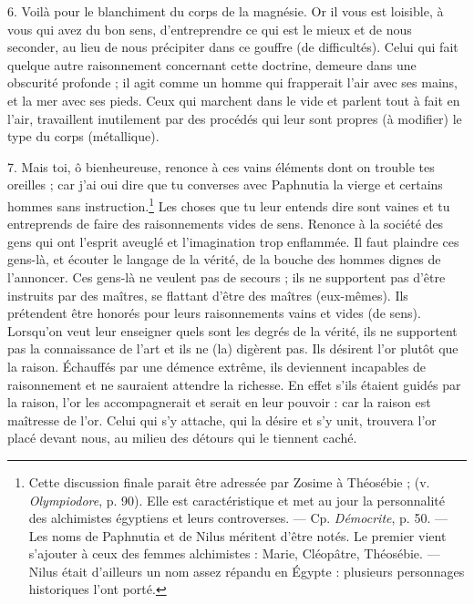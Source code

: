\documentclass[a4paper, 11pt, oneside, polutonikogreek, french]{article}
\begin{document}
6. Voilà pour le blanchiment du corps de la magnésie. Or il vous est loisible, à vous qui avez du bon sens, d'entreprendre ce qui est le mieux et de nous seconder, au lieu de nous précipiter dans ce gouffre (de difficultés). Celui qui fait quelque autre raisonnement concernant cette doctrine, demeure dans une obscurité profonde ; il agit comme un homme qui frapperait l'air avec ses mains, et la mer avec ses pieds. Ceux qui marchent dans le vide et parlent tout à fait en l'air, travaillent inutilement par des procédés qui leur sont propres (à modifier) le type du corps (métallique).

7. Mais toi, ô bienheureuse, renonce à ces vains éléments dont on trouble tes oreilles ; car j'ai oui dire que tu converses avec Paphnutia la vierge et certains hommes sans instruction.\footnote{Cette discussion finale parait être adressée par Zosime à Théosébie ; (v. \emph{Olympiodore}, p. 90). Elle est caractéristique et met au jour la personnalité des alchimistes égyptiens et leurs controverses. --- Cp. \emph{Démocrite}, p. 50. --- Les noms de Paphnutia et de Nilus méritent d'être notés. Le premier vient s'ajouter à ceux des femmes alchimistes : Marie, Cléopâtre, Théosébie. --- Nilus était d'ailleurs un nom assez répandu en Égypte : plusieurs personnages historiques l'ont porté.} Les choses que tu leur entends dire sont vaines et tu entreprends de faire des raisonnements vides de sens. Renonce à la société des gens qui ont l'esprit aveuglé et l'imagination trop enflammée. Il faut plaindre ces gens-là, et écouter le langage de la vérité, de la bouche des hommes dignes de l'annoncer. Ces gens-là ne veulent pas de secours ; ils ne supportent pas d'être instruits par des maîtres, se flattant d'être des maîtres (eux-mêmes). Ils prétendent être honorés pour leurs raisonnements vains et vides (de sens). Lorsqu'on veut leur enseigner quels sont les degrés de la vérité, ils ne supportent pas la connaissance de l'art et ils ne (la) digèrent pas. Ils désirent l'or plutôt que la raison. Échauffés par une démence extrême, ils deviennent incapables de raisonnement et ne sauraient attendre la richesse. En effet s'ils étaient guidés par la raison, l'or les accompagnerait et serait en leur pouvoir : car la raison est maîtresse de l'or. Celui qui s'y attache, qui la désire et s'y unit, trouvera l'or placé devant nous, au milieu des détours qui le tiennent caché.
\end{document}
